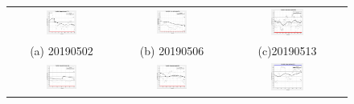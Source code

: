 \begin{figure}
\begin{tabular}{ccc}

    \includegraphics[width=0.3\textwidth]{Figure/20190502_F.JPG} &   \includegraphics[width=0.3\textwidth]{Figure/20190506_F.JPG}  &   \includegraphics[width=0.3\textwidth]{Figure/20190513_F.JPG} \\
    (a) 20190502 & (b) 20190506 & (c)20190513\\
    \includegraphics[width=0.3\textwidth]{Figure/20190521_F.JPG} &   \includegraphics[width=0.3\textwidth]{Figure/20190610_F.JPG}  &   \includegraphics[width=0.3\textwidth]{Figure/20190624_F.JPG} \\

\end{tabular}
\end{figure}
